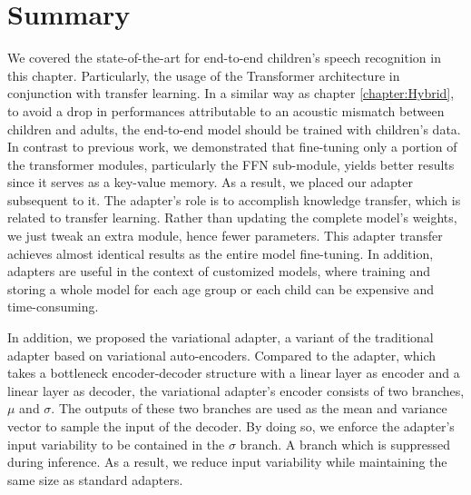 \section{Summary}
We covered the state-of-the-art for end-to-end children's speech recognition in this chapter. Particularly, the usage of the Transformer architecture in conjunction with transfer learning. In a similar way as chapter \ref{chapter:Hybrid}, to avoid a drop in performances attributable to an acoustic mismatch between children and adults, the end-to-end model should be trained with children's data. In contrast to previous work, we demonstrated that fine-tuning only a portion of the transformer modules, particularly the FFN sub-module, yields better results since it serves as a key-value memory. As a result, we placed our adapter subsequent to it. The adapter's role is to accomplish knowledge transfer, which is related to transfer learning. Rather than updating the complete model's weights, we just tweak an extra module, hence fewer parameters. This adapter transfer achieves almost identical results as the entire model fine-tuning. In addition, adapters are useful in the context of customized models, where training and storing a whole model for each age group or each child can be expensive and time-consuming.

In addition, we proposed the variational adapter, a variant of the traditional adapter based on variational auto-encoders. Compared to the adapter, which takes a bottleneck encoder-decoder structure with a linear layer as encoder and a linear layer as decoder, the variational adapter's encoder consists of two branches, $\mu$ and $\sigma$. The outputs of these two branches are used as the mean and variance vector to sample the input of the decoder. By doing so, we enforce the adapter's input variability to be contained in the $\sigma$ branch. A branch which is suppressed during inference. As a result, we reduce input variability while maintaining the same size as standard adapters.